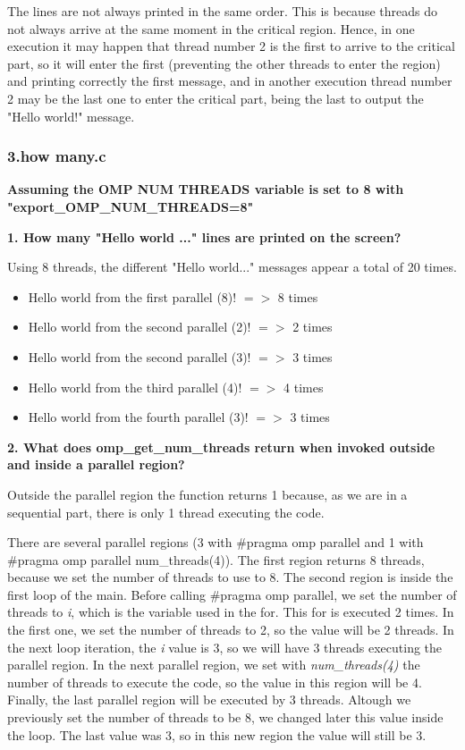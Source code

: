 \documentclass[12pt, a4paper]{article}
\begin{document}
The lines are not always printed in the same order. This is because threads do not always arrive at the same moment in the critical region. Hence, in one execution it may happen that thread number 2 is the first to arrive to the critical part, so it will enter the first (preventing the other threads to enter the region) and printing correctly the first message, and in another execution thread number 2 may be the last one to enter the critical part, being the last to output the "Hello world!" message.

\subsubsection{3.how many.c}

\textbf{Assuming the OMP NUM THREADS variable is set to 8 with "export\_OMP\_NUM\_THREADS=8"}

\hfill

\textbf{1. How many "Hello world ..." lines are printed on the screen?}

Using 8 threads, the different "Hello world..." messages appear a total of 20 times.

\begin{itemize}
	\item Hello world from the first parallel (8)! $=>$ 8 times
	\item Hello world from the second parallel (2)! $=>$ 2 times
	\item Hello world from the second parallel (3)! $=>$ 3 times
	\item Hello world from the third parallel (4)! $=>$ 4 times
	\item Hello world from the fourth  parallel (3)! $=>$ 3 times
\end{itemize}

\hfill

\textbf{2. What does omp\_get\_num\_threads return when invoked outside and inside a parallel region?}

Outside the parallel region the function returns 1 because, as we are in a sequential part, there is only 1 thread executing the code.

There are several parallel regions (3 with \#pragma omp parallel and 1 with \#pragma omp parallel num\_threads(4)). The first region returns 8 threads, because we set the number of threads to use to 8. The second region is inside the first loop of the main. Before calling \#pragma omp parallel, we set the number of threads to \textit{i}, which is the variable used in the for. This for is executed 2 times. In the first one, we set the number of threads to 2, so the value will be 2 threads. In the next loop iteration, the \textit{i} value is 3, so we will have 3 threads executing the parallel region. In the next parallel region, we set with \textit{num\_threads(4)} the number of threads to execute the code, so the value in this region will be 4. Finally, the last parallel region will be executed by 3 threads. Altough we previously set the number of threads to be 8, we changed later this value inside the loop. The last value was 3, so in this new region the value will still be 3.
\end{document}
